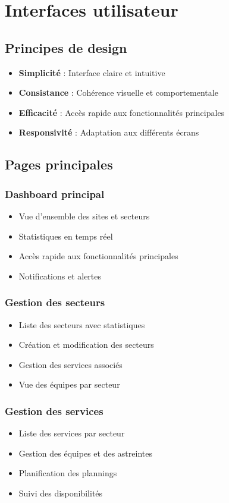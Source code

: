 \section{Interfaces utilisateur}
\subsection{Principes de design}
\begin{itemize}
    \item \textbf{Simplicité} : Interface claire et intuitive
    \item \textbf{Consistance} : Cohérence visuelle et comportementale
    \item \textbf{Efficacité} : Accès rapide aux fonctionnalités principales
    \item \textbf{Responsivité} : Adaptation aux différents écrans
\end{itemize}

\subsection{Pages principales}
\subsubsection{Dashboard principal}
\begin{itemize}
    \item Vue d'ensemble des sites et secteurs
    \item Statistiques en temps réel
    \item Accès rapide aux fonctionnalités principales
    \item Notifications et alertes
\end{itemize}

\subsubsection{Gestion des secteurs}
\begin{itemize}
    \item Liste des secteurs avec statistiques
    \item Création et modification des secteurs
    \item Gestion des services associés
    \item Vue des équipes par secteur
\end{itemize}

\subsubsection{Gestion des services}
\begin{itemize}
    \item Liste des services par secteur
    \item Gestion des équipes et des astreintes
    \item Planification des plannings
    \item Suivi des disponibilités
\end{itemize}

